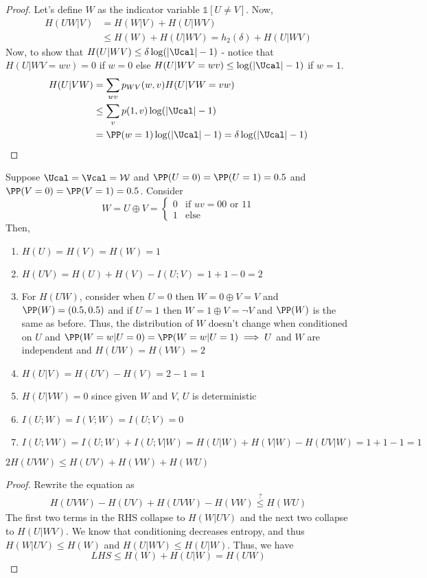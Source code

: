 \begin{proof}
Let's define $W$ as the indicator variable $\mathbb{1}[U\neq V]$. Now,
\begin{align*}
    H(UW|V) &= H(W|V) + H(U|WV) \\
    &\leq H(W) + H(U|WV) = h_2(\delta) + H(U|WV)
\end{align*}
Now, to show that $H(U|WV) \leq \delta \log(|\Ucal| - 1)$ - notice that $H(U|WV=wv) = 0$ if $w = 0$ else $H(U|WV=wv) \leq \log(|\Ucal| - 1)$ if $w = 1$.
\begin{align*}
    H(U|VW) &= \sum_{wv} p_{WV}(w,v)H(U|VW=vw) \\
    &\leq\sum_v p(1,v) \log(|\Ucal| - 1)  \\
    &= \PP(w=1)\log(|\Ucal|-1) = \delta \log(|\Ucal| - 1)
\end{align*}
\end{proof}
\begin{eg}
Suppose $\Ucal = \Vcal = \mathcal{W}$ and $\PP(U=0) = \PP(U=1) = 0.5$ and $\PP(V=0) = \PP(V=1) = 0.5$. Consider 
\[W = U \oplus V = \begin{cases}
0 & \text{if } uv = 00 \text{ or } 11 \\
1 & \text{else }
\end{cases}\]
Then,
\begin{enumerate}
    \item $H(U) = H(V) = H(W) = 1$
    \item $H(UV) = H(U) + H(V) - I(U;V) = 1 + 1 - 0 = 2$
    \item For $H(UW)$, consider when $U = 0$ then $W = 0 \oplus V = V$ and $\PP(W) = (0.5, 0.5)$ and if $U = 1$ then $W = 1 \oplus V = \neg V$ and $\PP(W)$ is the same as before. Thus, the distribution of $W$ doesn't change when conditioned on $U$ and $\PP(W=w|U=0) = \PP(W=w|U=1) \implies U$ and $W$ are independent and $H(UW) = H(VW) = 2$ 
    \item $H(U|V) = H(UV) - H(V) = 2 - 1 = 1$
    \item $H(U|VW) = 0$ since given $W$ and $V$, $U$ is deterministic
    \item $I(U;W) = I(V;W) = I(U;V) = 0$
    \item $I(U;VW) = I(U;W) + I(U;V|W) = H(U|W) + H(V|W) - H(UV|W) = 1 + 1 - 1 = 1$
\end{enumerate}
\end{eg}
\begin{theorem}
$2H(UVW) \leq H(UV) + H(VW) + H(WU)$
\end{theorem}
\begin{proof}
Rewrite the equation as
\begin{align*}
    H(UVW) - H(UV) + H(UVW) - H(VW) \overset{?}{\leq} H(WU) 
\end{align*}
The first two terms in the RHS collapse to $H(W|UV)$ and the next two collapse to $H(U|WV)$. We know that conditioning decreases entropy, and thus $H(W|UV) \leq H(W)$ and $H(U|WV) \leq H(U|W)$. Thus, we have
\[LHS \leq H(W) + H(U|W) = H(UW)\]
\end{proof}
